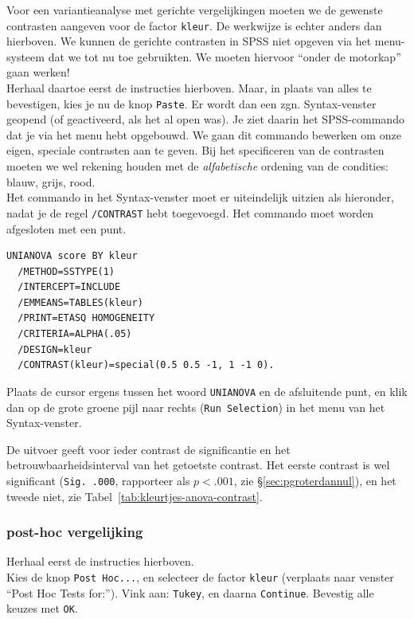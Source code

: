 \documentclass[
]{book}
\begin{document}
Voor een variantieanalyse met gerichte vergelijkingen moeten we de
gewenste contrasten aangeven voor de factor \texttt{kleur}. De werkwijze is
echter anders dan hierboven. We kunnen de gerichte contrasten in SPSS
niet opgeven via het menu-systeem dat we tot nu toe gebruikten. We
moeten hiervoor ``onder de motorkap'' gaan werken!\\
Herhaal daartoe eerst de instructies hierboven. Maar, in plaats van
alles te bevestigen, kies je nu de knop \texttt{Paste}. Er wordt dan
een zgn. Syntax-venster geopend (of geactiveerd, als het al open was).
Je ziet daarin het SPSS-commando dat je via het menu hebt opgebouwd. We
gaan dit commando bewerken om onze eigen, speciale contrasten aan te
geven. Bij het specificeren van de contrasten moeten we wel rekening
houden met de \emph{alfabetische} ordening van de condities: blauw, grijs,
rood.\\
Het commando in het Syntax-venster moet er uiteindelijk uitzien als
hieronder, nadat je de regel \texttt{/CONTRAST} hebt toegevoegd. Het commando
moet worden afgesloten met een punt.\\

\begin{verbatim}
UNIANOVA score BY kleur
  /METHOD=SSTYPE(1)
  /INTERCEPT=INCLUDE
  /EMMEANS=TABLES(kleur) 
  /PRINT=ETASQ HOMOGENEITY
  /CRITERIA=ALPHA(.05)
  /DESIGN=kleur
  /CONTRAST(kleur)=special(0.5 0.5 -1, 1 -1 0).
\end{verbatim}

Plaats de cursor ergens tussen het woord \texttt{UNIANOVA} en de afsluitende
punt, en klik dan op de grote groene pijl naar rechts (\texttt{Run\ Selection})
in het menu van het Syntax-venster.

De uitvoer geeft voor ieder contrast de significantie en het
betrouwbaarheidsinterval van het getoetste contrast. Het eerste contrast
is wel significant (\texttt{Sig.\ .000}, rapporteer als \(p<.001\), zie §\ref{sec:pgroterdannul}), en het tweede niet, zie
Tabel~\ref{tab:kleurtjes-anova-contrast}.

\hypertarget{post-hoc-vergelijking}{%
\subsubsection{post-hoc vergelijking}\label{post-hoc-vergelijking}}

Herhaal eerst de instructies hierboven.\\
Kies de knop \texttt{Post\ Hoc...}, en selecteer de factor \texttt{kleur}
(verplaats naar venster ``Post Hoc Tests for:''). Vink aan: \texttt{Tukey}, en
daarna \texttt{Continue}. Bevestig alle keuzes met \texttt{OK}.
\end{document}
